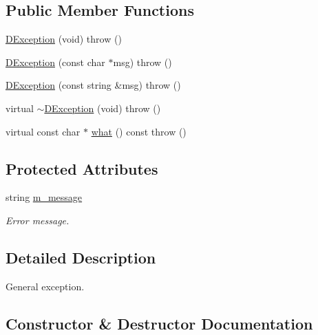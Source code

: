 \subsection*{Public Member Functions}
\begin{DoxyCompactItemize}
\item 
\hyperlink{classDUtils_1_1DException_a2a7b85153de7d01a46606271c32254ce}{D\+Exception} (void)  throw ()
\item 
\hyperlink{classDUtils_1_1DException_aba7bdd9f0c908590dc48cfacb50efc56}{D\+Exception} (const char $\ast$msg)  throw ()
\item 
\hyperlink{classDUtils_1_1DException_a611f325f78d0e79b3bac5234b3f9ff99}{D\+Exception} (const string \&msg)  throw ()
\item 
virtual \hyperlink{classDUtils_1_1DException_a12deb785f50e9cb2db3541ffb60a20bb}{$\sim$\+D\+Exception} (void)  throw ()
\item 
virtual const char $\ast$ \hyperlink{classDUtils_1_1DException_ad5d0ccb4bf61cdb3e23b2b5b9e1a402c}{what} () const  throw ()
\end{DoxyCompactItemize}
\subsection*{Protected Attributes}
\begin{DoxyCompactItemize}
\item 
\mbox{\label{classDUtils_1_1DException_ab31e6216df2034af61edb32632006bfb}} 
string \hyperlink{classDUtils_1_1DException_ab31e6216df2034af61edb32632006bfb}{m\+\_\+message}
\begin{DoxyCompactList}\small\item\em Error message. \end{DoxyCompactList}\end{DoxyCompactItemize}


\subsection{Detailed Description}
General exception. 

\subsection{Constructor \& Destructor Documentation}
\mbox{\label{classDUtils_1_1DException_a2a7b85153de7d01a46606271c32254ce}} 
